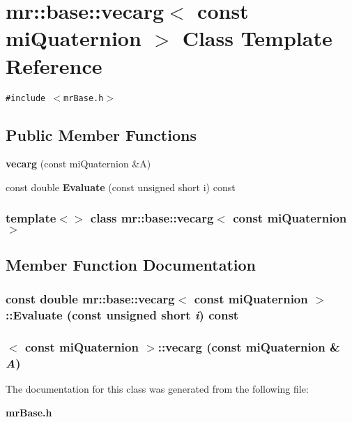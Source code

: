 \section{mr::base::vecarg$<$ const mi\-Quaternion $>$ Class Template Reference}
\label{classmr_1_1base_1_1vecarg_3_01const_01miQuaternion_01_4}
{\tt \#include $<$mr\-Base.h$>$}

\subsection*{Public Member Functions}
\begin{CompactItemize}
\item 
{\bf vecarg} (const mi\-Quaternion \&A)
\item 
const double {\bf Evaluate} (const unsigned short i) const 
\end{CompactItemize}
\subsubsection*{template$<$$>$ class mr::base::vecarg$<$ const mi\-Quaternion $>$}



\subsection{Member Function Documentation}
\subsubsection{\setlength{\rightskip}{0pt plus 5cm}const double {\bf mr::base::vecarg}$<$ const mi\-Quaternion $>$::Evaluate (const unsigned short {\em i}) const\hspace{0.3cm}{\tt  [inline]}}\label{classmr_1_1base_1_1vecarg_3_01const_01miQuaternion_01_4_a1}


\subsubsection{$<$ const mi\-Quaternion $>$::{\bf vecarg} (const mi\-Quaternion \& {\em A})\hspace{0.3cm}{\tt  [inline]}}\label{classmr_1_1base_1_1vecarg_3_01const_01miQuaternion_01_4_a0}




The documentation for this class was generated from the following file:\begin{CompactItemize}
\item 
{\bf mr\-Base.h}\end{CompactItemize}

